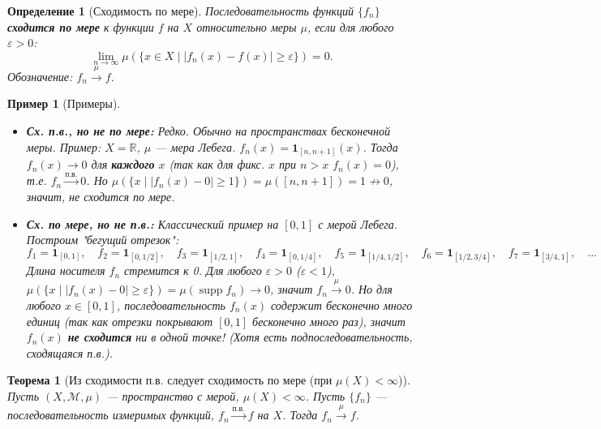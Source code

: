 \documentclass[a4paper, 12pt]{article}
\newtheorem{definition}{Определение}
\newtheorem{theorem}{Теорема}
\newtheorem{example}{Пример}
\newcommand{\R}{\mathbb{R}}
\newcommand{\1}{\mathbf{1}}
\begin{document}
\begin{definition}[Сходимость по мере]
    Последовательность функций $\{f_n\}$ \textbf{сходится по мере} к функции $f$ на $X$ относительно меры $\mu$, если для любого $\varepsilon > 0$:
    \[
    \lim_{n \to \infty} \mu(\{x \in X \mid |f_n(x) - f(x)| \geq \varepsilon\}) = 0.
    \]
    Обозначение: $f_n \xrightarrow{\mu} f$.
\end{definition}

\begin{example}[Примеры]
    \hfill
    \begin{itemize}
        \item \textbf{Сх. п.в., но не по мере:} Редко. Обычно на пространствах бесконечной меры. Пример: $X = \R$, $\mu$ — мера Лебега. $f_n(x) = \1_{[n, n+1]}(x)$. Тогда $f_n(x) \to 0$ для \textbf{каждого} $x$ (так как для фикс. $x$ при $n > x$ $f_n(x) = 0$), т.е. $f_n \xrightarrow{\text{п.в.}} 0$. Но $\mu(\{x \mid |f_n(x) - 0| \geq 1\}) = \mu([n, n+1]) = 1 \not\to 0$, значит, не сходится по мере.
        \item \textbf{Сх. по мере, но не п.в.:} Классический пример на $[0,1]$ с мерой Лебега. Построим "бегущий отрезок":
        \[
        f_1 = \1_{[0,1]}, \quad f_2 = \1_{[0,1/2]}, \quad f_3 = \1_{[1/2,1]}, \quad f_4 = \1_{[0,1/4]}, \quad f_5 = \1_{[1/4,1/2]}, \quad f_6 = \1_{[1/2,3/4]}, \quad f_7 = \1_{[3/4,1]}, \quad \dots
        \]
        Длина носителя $f_n$ стремится к 0. Для любого $\varepsilon > 0$ ($\varepsilon < 1$), $\mu(\{x \mid |f_n(x) - 0| \geq \varepsilon\}) = \mu(\operatorname{supp} f_n) \to 0$, значит $f_n \xrightarrow{\mu} 0$. Но для любого $x \in [0,1]$, последовательность $f_n(x)$ содержит бесконечно много единиц (так как отрезки покрывают $[0,1]$ бесконечно много раз), значит $f_n(x)$ \textbf{не сходится} ни в одной точке! (Хотя есть подпоследовательность, сходящаяся п.в.).
    \end{itemize}
\end{example}

\begin{theorem}[Из сходимости п.в. следует сходимость по мере (при $\mu(X) < \infty$)]
    Пусть $(X, \mathcal{M}, \mu)$ — пространство с мерой, \textbf{$\mu(X) < \infty$}. Пусть $\{f_n\}$ — последовательность измеримых функций, $f_n \xrightarrow{\text{п.в.}} f$ на $X$. Тогда $f_n \xrightarrow{\mu} f$.
\end{theorem}
\end{document}
